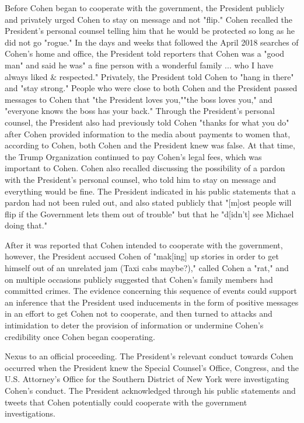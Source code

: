 {Before Cohen began to cooperate with the government, the President publicly and privately urged Cohen to stay on message and not "flip." Cohen recalled the President's personal counsel telling him that he would be protected so long as he did not go "rogue."
In the days and weeks that followed the April 2018 searches of Cohen's home and office, the President told reporters that Cohen was a "good man" and said he was" a fine person with a wonderful family ... who I have always liked \& respected."
Privately, the President told Cohen to "hang in there" and "stay strong." People who were close to both Cohen and the President passed messages to Cohen that "the President loves you,""the boss loves you," and "everyone knows the boss has your back."
Through the President's personal counsel, the President also had previously told Cohen "thanks for what you do" after Cohen provided information to the media about payments to women that, according to Cohen, both Cohen and the President knew was false.
At that time, the Trump Organization continued to pay Cohen's legal fees, which was important to Cohen.
Cohen also recalled discussing the possibility of a pardon with the President's personal counsel, who told him to stay on message and everything would be fine.
The President indicated in his public statements that a pardon had not been ruled out, and also stated publicly that "[m]ost people will flip if the Government lets them out of trouble" but that he "d[idn't] see Michael doing that."

After it was reported that Cohen intended to cooperate with the government, however, the President accused Cohen of "mak[ing] up stories in order to get himself out of an unrelated jam (Taxi cabs maybe?)," called Cohen a "rat," and on multiple occasions publicly suggested that Cohen's family members had committed crimes.
The evidence concerning this sequence of events could support an inference that the President used inducements in the form of positive messages in an effort to get Cohen not to cooperate, and then turned to attacks and intimidation to deter the provision of information or undermine Cohen's credibility once Cohen began cooperating.

Nexus to an official proceeding.
The President's relevant conduct towards Cohen occurred when the President knew the Special Counsel's Office, Congress, and the U.S. Attorney's Office for the Southern District of New York were investigating Cohen's conduct.
The President acknowledged through his public statements and tweets that Cohen potentially could cooperate with the government investigations.

}
